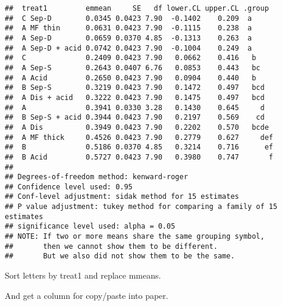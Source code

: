 \documentclass[
]{article}
\newenvironment{Shaded}{\begin{snugshade}}{\end{snugshade}}
\newcommand{\DecValTok}[1]{\textcolor[rgb]{0.00,0.00,0.81}{#1}}
\newcommand{\FunctionTok}[1]{\textcolor[rgb]{0.13,0.29,0.53}{\textbf{#1}}}
\newcommand{\NormalTok}[1]{#1}
\newcommand{\OtherTok}[1]{\textcolor[rgb]{0.56,0.35,0.01}{#1}}
\newcommand{\SpecialCharTok}[1]{\textcolor[rgb]{0.81,0.36,0.00}{\textbf{#1}}}
\newcommand{\StringTok}[1]{\textcolor[rgb]{0.31,0.60,0.02}{#1}}
\begin{document}
\begin{verbatim}
##  treat1         emmean     SE   df lower.CL upper.CL .group 
##  C Sep-D        0.0345 0.0423 7.90  -0.1402    0.209  a     
##  A MF thin      0.0631 0.0423 7.90  -0.1115    0.238  a     
##  A Sep-D        0.0659 0.0370 4.85  -0.1313    0.263  a     
##  A Sep-D + acid 0.0742 0.0423 7.90  -0.1004    0.249  a     
##  C              0.2409 0.0423 7.90   0.0662    0.416   b    
##  A Sep-S        0.2643 0.0407 6.76   0.0853    0.443   bc   
##  A Acid         0.2650 0.0423 7.90   0.0904    0.440   b    
##  B Sep-S        0.3219 0.0423 7.90   0.1472    0.497   bcd  
##  A Dis + acid   0.3222 0.0423 7.90   0.1475    0.497   bcd  
##  A              0.3941 0.0330 3.28   0.1430    0.645     d  
##  B Sep-S + acid 0.3944 0.0423 7.90   0.2197    0.569    cd  
##  A Dis          0.3949 0.0423 7.90   0.2202    0.570   bcde 
##  A MF thick     0.4526 0.0423 7.90   0.2779    0.627     def
##  B              0.5186 0.0370 4.85   0.3214    0.716      ef
##  B Acid         0.5727 0.0423 7.90   0.3980    0.747       f
## 
## Degrees-of-freedom method: kenward-roger 
## Confidence level used: 0.95 
## Conf-level adjustment: sidak method for 15 estimates 
## P value adjustment: tukey method for comparing a family of 15 estimates 
## significance level used: alpha = 0.05 
## NOTE: If two or more means share the same grouping symbol,
##       then we cannot show them to be different.
##       But we also did not show them to be the same.
\end{verbatim}

Sort letters by treat1 and replace mmeans.

\begin{Shaded}
\end{Shaded}

And get a column for copy/paste into paper.

\begin{Shaded}
\end{Shaded}
\end{document}
